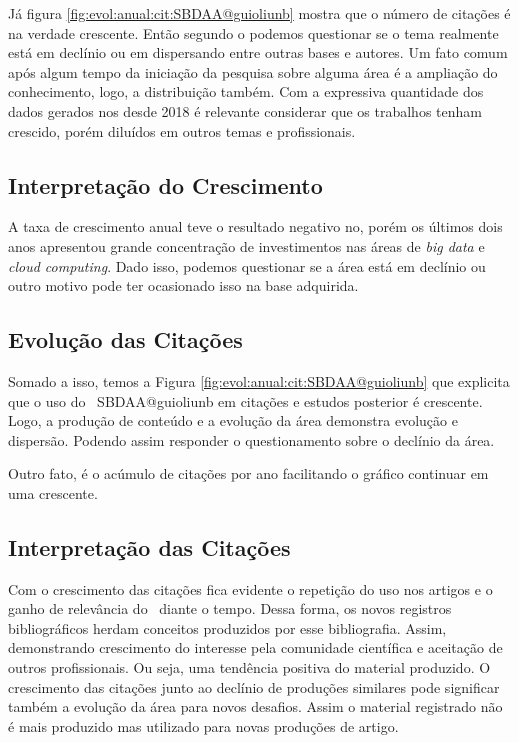 Já figura \ref{fig:evol:anual:cit:SBDAA@guioliunb} mostra que o número de citações é na verdade crescente. Então segundo o podemos questionar se o tema realmente está em declínio ou em dispersando entre outras bases e autores. Um fato comum após algum tempo da iniciação da pesquisa sobre alguma área é a ampliação do conhecimento, logo, a distribuição também. Com a expressiva quantidade dos dados gerados nos desde 2018 é relevante considerar que os trabalhos tenham crescido, porém diluídos em outros temas e profissionais.

\subsection{Interpretação do Crescimento} 

A taxa de crescimento anual teve o resultado negativo no, porém os últimos dois anos apresentou grande concentração de investimentos nas áreas de \textit{big data} e \textit{cloud computing}. Dado isso, podemos questionar se a área está em declínio ou outro motivo pode ter ocasionado isso na base adquirida.

\subsection{Evolução das Citações}

Somado a isso, temos a Figura \ref{fig:evol:anual:cit:SBDAA@guioliunb} que explicita que o uso do \dataset\  SBDAA@guioliunb em citações e estudos posterior é crescente. Logo, a produção de conteúdo e a evolução da área demonstra evolução e dispersão. Podendo assim responder o questionamento sobre o declínio da área.

Outro fato, é o acúmulo de citações por ano facilitando o gráfico continuar em uma crescente.



\subsection{Interpretação das Citações}
Com o crescimento das citações fica evidente o repetição do uso nos artigos e o ganho de relevância do \dataset\ diante o tempo. Dessa forma, os novos registros bibliográficos herdam conceitos produzidos por esse bibliografia. Assim, demonstrando crescimento do interesse pela comunidade científica e aceitação de outros profissionais. Ou seja, uma tendência positiva do material produzido.
O crescimento das citações junto ao declínio de produções similares pode significar também a evolução da área para novos desafios. Assim o material registrado não é mais produzido mas utilizado para novas produções de artigo.

